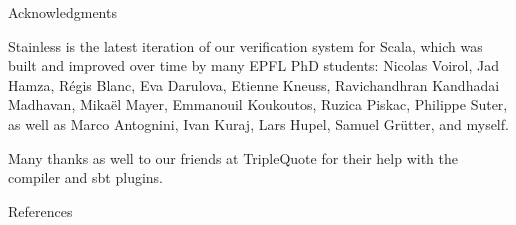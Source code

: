 \documentclass[
  ignorenonframetext,
]{beamer}
\newif\ifbibliography
\begin{document}
\begin{frame}{Acknowledgments}
\protect\hypertarget{acknowledgments}{}

Stainless is the latest iteration of our verification system for Scala,
which was built and improved over time by many EPFL PhD students:
Nicolas Voirol, Jad Hamza, Régis Blanc, Eva Darulova, Etienne Kneuss,
Ravichandhran Kandhadai Madhavan, Mikaël Mayer, Emmanouil Koukoutos,
Ruzica Piskac, Philippe Suter, as well as Marco Antognini, Ivan Kuraj,
Lars Hupel, Samuel Grütter, and myself.

Many thanks as well to our friends at TripleQuote for their help with
the compiler and sbt plugins.

\end{frame}

\begin{frame}[allowframebreaks]{References}
  \bibliographytrue
  \printbibliography[heading=none]
\end{frame}
\end{document}

